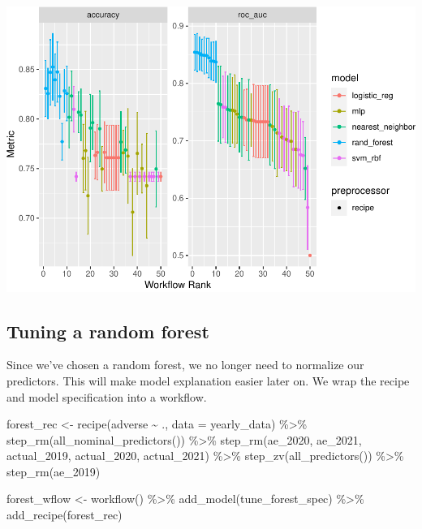 \documentclass[
]{article}
\newenvironment{Shaded}{\begin{snugshade}}{\end{snugshade}}
\newcommand{\AttributeTok}[1]{\textcolor[rgb]{0.77,0.63,0.00}{#1}}
\newcommand{\FunctionTok}[1]{\textcolor[rgb]{0.00,0.00,0.00}{#1}}
\newcommand{\NormalTok}[1]{#1}
\newcommand{\OtherTok}[1]{\textcolor[rgb]{0.56,0.35,0.01}{#1}}
\newcommand{\SpecialCharTok}[1]{\textcolor[rgb]{0.00,0.00,0.00}{#1}}
\begin{document}
\includegraphics{figures/report/fig-unnamed-chunk-20-1.pdf}

\hypertarget{tuning-a-random-forest}{%
\subsection{Tuning a random forest}\label{tuning-a-random-forest}}

Since we've chosen a random forest, we no longer need to normalize our
predictors. This will make model explanation easier later on. We wrap
the recipe and model specification into a workflow.

\begin{Shaded}
\begin{Highlighting}[]
\NormalTok{forest\_rec }\OtherTok{\textless{}{-}}
  \FunctionTok{recipe}\NormalTok{(adverse }\SpecialCharTok{\textasciitilde{}}\NormalTok{ ., }\AttributeTok{data =}\NormalTok{ yearly\_data) }\SpecialCharTok{\%\textgreater{}\%}
  \FunctionTok{step\_rm}\NormalTok{(}\FunctionTok{all\_nominal\_predictors}\NormalTok{()) }\SpecialCharTok{\%\textgreater{}\%}
  \FunctionTok{step\_rm}\NormalTok{(ae\_2020, ae\_2021, actual\_2019, actual\_2020, actual\_2021) }\SpecialCharTok{\%\textgreater{}\%}
  \FunctionTok{step\_zv}\NormalTok{(}\FunctionTok{all\_predictors}\NormalTok{()) }\SpecialCharTok{\%\textgreater{}\%}
  \FunctionTok{step\_rm}\NormalTok{(ae\_2019)}

\NormalTok{forest\_wflow }\OtherTok{\textless{}{-}}
  \FunctionTok{workflow}\NormalTok{() }\SpecialCharTok{\%\textgreater{}\%}
  \FunctionTok{add\_model}\NormalTok{(tune\_forest\_spec) }\SpecialCharTok{\%\textgreater{}\%}
  \FunctionTok{add\_recipe}\NormalTok{(forest\_rec)}
\end{Highlighting}
\end{Shaded}
\end{document}
